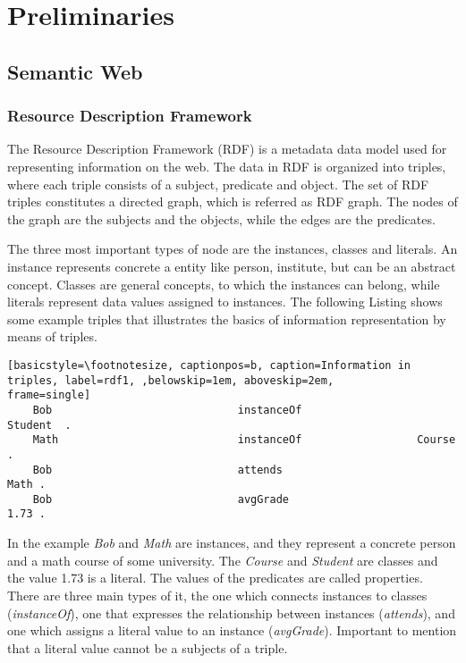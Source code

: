 \chapter{Preliminaries}

\section{Semantic Web}

\subsection{Resource Description Framework}


The Resource Description Framework (RDF) is a metadata data model used for representing information on the web. The data in RDF is organized into triples, where each triple consists of a subject, predicate and object. The set of RDF triples constitutes a directed graph, which is referred as RDF graph. The nodes of the graph are the subjects and the objects, while the edges are the predicates.

The three most important types of node are the instances, classes and literals. An instance represents concrete a entity like person, institute, but can be an abstract concept. Classes are general concepts, to which the instances can belong, while literals represent data values assigned to instances. The following Listing shows some example triples that illustrates the basics of information representation by means of triples.

\begin{lstlisting}[basicstyle=\footnotesize, captionpos=b, caption=Information in triples, label=rdf1, ,belowskip=1em, aboveskip=2em,
frame=single]
	Bob								instanceOf					Student  .
	Math							instanceOf					Course . 		
	Bob								attends							Math . 		
	Bob								avgGrade						1.73 .
\end{lstlisting}

In the example \textit{Bob} and \textit{Math} are instances, and they represent a concrete person and a math course of some university. The \textit{Course} and \textit{Student} are classes and the value 1.73 is a literal. The values of the predicates are called properties. There are three main types of it, the one which connects instances to classes (\textit{instanceOf}), one that expresses the relationship between instances (\textit{attends}), and one which assigns a literal value to an instance (\textit{avgGrade}). Important to mention that a literal value cannot be a subjects of a triple.

